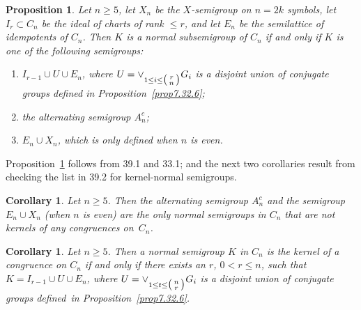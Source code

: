 \documentclass{surv-l}
\numberwithin{equation}{section}
\numberwithin{table}{section}
\numberwithin{figure}{section}
\theoremstyle{plain}
\newtheorem{corollary}[equation]{Corollary}
\newtheorem{proposition}[equation]{Proposition}
\theoremstyle{definition}
\begin{document}
\begin{proposition}\label{prop8.39.2}
Let $n \geq 5$, let $X_{n}$ be the
$X$-semigroup on $n=2k$ symbols, let
$I_{r}\subset C_{n}$ be the ideal of charts of rank $\leq r$, and
let $E_{n}$ be the semilattice of idempotents of $C_{n}$. Then $K$
is a normal subsemigroup of $C_{n}$ if and only if $K$ is one of
the following semigroups:
\begin{enumerate}
\item[(1)] $I_{r-1}\cup U\cup E_{n}$, where $U=\vee_{1\leq
i\leq\big(\kern0.5pt\begin{smallmatrix}{r}\\
{n}\end{smallmatrix}\kern0.5pt\big)}G_{i}$ is a disjoint union of
conjugate groups defined in \emph{Proposition~\ref{prop7.32.6}};

\item[(2)] the alternating semigroup $A_{n}^{c}$;

\item[(3)] $E_{n}\cup X_{n}$, which is only defined when $n$ is even.
\end{enumerate}
\end{proposition}

Proposition~\ref{prop8.39.2} follows from 39.1 and 33.1; and the
next two corollaries result from checking the list in 39.2 for
kernel-normal semigroups.

\begin{corollary}\label{cor8.39.3}
Let $n \geq 5$. Then the alternating semigroup $A_{n}^{c}$ and the
semigroup $E_{n}\cup X_{n}$ (when $n$ is even) are the only normal
semigroups in $C_{n}$ that are not kernels of any
congruences on~$C_{n}$.
\end{corollary}

\begin{corollary}\label{cor8.39.4}
Let $n \geq 5$. Then a normal semigroup $K$ in $C_{n}$ is the
kernel of a congruence on $C_{n}$ if and only if there exists an
$r$, $0<r\leq n$, such that $K=I_{r-1}\cup U\cup E_{n}$, where
$U=\vee_{1\leq t\leq\big(\kern0.5pt\begin{smallmatrix}n\\r\end{smallmatrix}\kern0.5pt\big)}G_{i}$ is a disjoint union of
conjugate groups defined~in \emph{Proposition~\ref{prop7.32.6}}.
\end{corollary}
\end{document}
